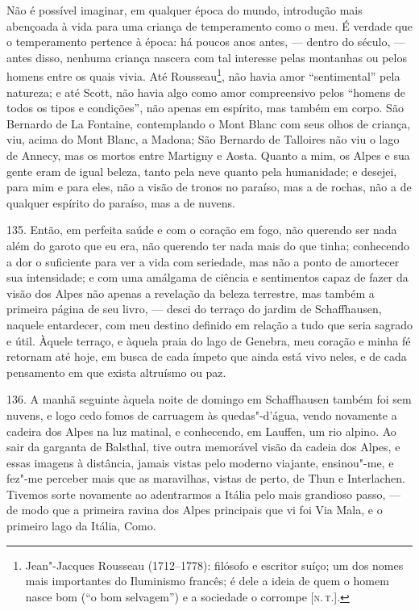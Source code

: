 Não é possível imaginar, em qualquer época do mundo, introdução mais
abençoada à vida para uma criança de temperamento como o meu. É verdade
que o temperamento pertence à época: há poucos anos antes, --- dentro do
século, --- antes disso, nenhuma criança nascera com tal interesse pelas
montanhas ou pelos homens entre os quais vivia. Até Rousseau\footnote{Jean"-Jacques
  Rousseau (1712--1778): filósofo e escritor suíço; um dos nomes mais
  importantes do Iluminismo francês; é dele a ideia de quem o homem
  nasce bom (``o bom selvagem'') e a sociedade o corrompe {[}\textsc{n.\,t.}{]}.}, não havia amor ``sentimental'' pela natureza; e até Scott,
não havia algo como amor compreensivo pelos ``homens de todos os tipos e
condições'', não apenas em espírito, mas também em corpo. São Bernardo
de La Fontaine, contemplando o Mont Blanc com seus olhos de criança,
viu, acima do Mont Blanc, a Madona; São Bernardo de Talloires não viu o
lago de Annecy, mas os mortos entre Martigny e Aosta. Quanto a mim, os
Alpes e sua gente eram de igual beleza, tanto pela neve quanto pela
humanidade; e desejei, para mim e para eles, não a visão de tronos no
paraíso, mas a de rochas, não a de qualquer espírito do paraíso, mas a
de nuvens.

135. Então, em perfeita saúde e com o coração em fogo, não querendo ser
nada além do garoto que eu era, não querendo ter nada mais do que tinha;
conhecendo a dor o suficiente para ver a vida com seriedade, mas não a
ponto de amortecer sua intensidade; e com uma amálgama de ciência e
sentimentos capaz de fazer da visão dos Alpes não apenas a revelação da
beleza terrestre, mas também a primeira página de seu livro, --- desci do
terraço do jardim de Schaffhausen, naquele entardecer, com meu destino
definido em relação a tudo que seria sagrado e útil. Àquele terraço, e
àquela praia do lago de Genebra, meu coração e minha fé retornam até
hoje, em busca de cada ímpeto que ainda está vivo neles, e de cada
pensamento em que exista altruísmo ou paz.

136. A manhã seguinte àquela noite de domingo em Schaffhausen também foi
sem nuvens, e logo cedo fomos de carruagem às quedas"-d'água, vendo
novamente a cadeira dos Alpes na luz matinal, e conhecendo, em Lauffen,
um rio alpino. Ao sair da garganta de Balsthal, tive outra memorável
visão da cadeia dos Alpes, e essas imagens à distância, jamais vistas
pelo moderno viajante, ensinou"-me, e fez"-me perceber mais que as
maravilhas, vistas de perto, de Thun e Interlachen. Tivemos sorte
novamente ao adentrarmos a Itália pelo mais grandioso passo, --- de modo
que a primeira ravina dos Alpes principais que vi foi Via Mala, e o
primeiro lago da Itália, Como.


